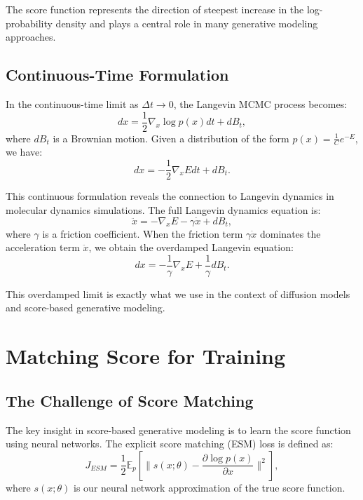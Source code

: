 The score function represents the direction of steepest increase in the log-probability density and plays a central role in many generative modeling approaches.

\subsection{Continuous-Time Formulation}

In the continuous-time limit as $\Delta t \to 0$, the Langevin MCMC process becomes:
\begin{equation}
dx = \frac{1}{2}\nabla_x\log p(x) dt + dB_t,
\end{equation}
where $dB_t$ is a Brownian motion. Given a distribution of the form $p(x) = \frac{1}{C}e^{-E}$, we have:
\begin{equation}
dx = -\frac{1}{2}\nabla_x E dt + dB_t.
\end{equation}

This continuous formulation reveals the connection to Langevin dynamics in molecular dynamics simulations. The full Langevin dynamics equation is:
\begin{equation}
\ddot{x} = -\nabla_x E - \gamma \dot{x} + dB_t,
\end{equation}
where $\gamma$ is a friction coefficient. When the friction term $\gamma \dot{x}$ dominates the acceleration term $\ddot{x}$, we obtain the overdamped Langevin equation:
\begin{equation}
dx = -\frac{1}{\gamma}\nabla_x E + \frac{1}{\gamma}dB_t.
\end{equation}

This overdamped limit is exactly what we use in the context of diffusion models and score-based generative modeling.

\section{Matching Score for Training}

\subsection{The Challenge of Score Matching}

The key insight in score-based generative modeling is to learn the score function using neural networks. The explicit score matching (ESM) loss is defined as:
\begin{equation}
J_{ESM} = \frac{1}{2} \mathbb{E}_p\left[\|s(x;\theta) - \frac{\partial \log p(x)}{\partial x}\|^2\right],
\end{equation}
where $s(x;\theta)$ is our neural network approximation of the true score function.

